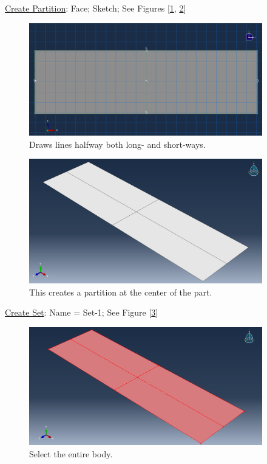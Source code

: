 \documentclass{article}
\begin{document}
	\underline{Create Partition}: Face; Sketch; See Figures [\ref{fig:partitionsketch}, \ref{fig:partition}]	
	\begin{figure}[H]
		\centering
		\includegraphics[width=4in]{Figures/partition_sketch.png}
		\caption{Draws lines halfway both long- and short-ways.}
		\label{fig:partitionsketch}
	\end{figure}
	\begin{figure}[H]
		\centering
		\includegraphics[width=4in]{Figures/partition.png}
		\caption{This creates a partition at the center of the part.}
		\label{fig:partition}
	\end{figure}
	
	\underline{Create Set}: Name = Set-1; See Figure [\ref{fig:set1}]
	\begin{figure}[H]
		\centering
		\includegraphics[width=4in]{Figures/set1.png}
		\caption{Select the entire body.}
		\label{fig:set1}
	\end{figure}
	
\end{document}
